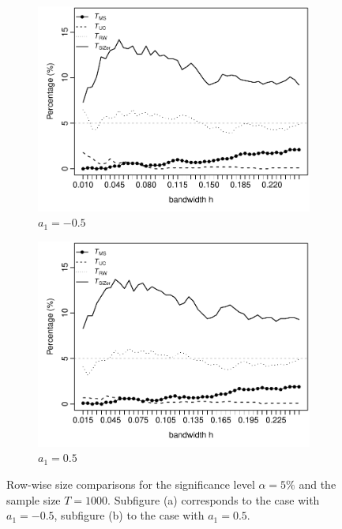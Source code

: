 \begin{figure}[t!]
\begin{subfigure}{.5\textwidth}
\centering
\includegraphics[width=\linewidth]{Plots/pcp_size_T_1000_a1_-50.pdf}
\caption{$a_1 = -0.5$}
\end{subfigure}
\begin{subfigure}{.5\textwidth}
\centering
\includegraphics[width=\linewidth]{Plots/pcp_size_T_1000_a1_50.pdf}
\caption{$a_1 = 0.5$}
\end{subfigure}
\caption{Row-wise size comparisons for the significance level $\alpha=5\%$ and the sample size $T=1000$. Subfigure (a) corresponds to the case with $a_1=-0.5$, subfigure (b) to the case with $a_1=0.5$.}\label{fig:sim:size:compare}
\end{figure}


